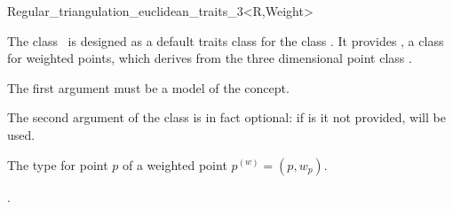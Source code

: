 

\begin{ccRefClass}{Regular_triangulation_euclidean_traits_3<R,Weight>}  %


\ccDefinition
  
The class \ccRefName\ is designed as a default traits class for the
class . 
It provides , a class for weighted points, which derives
from the three dimensional point class .

The first argument  must be a model of the  concept. 

The second argument  of the class
 is in fact
optional: if is it not provided,  will be used.


\ccIsModel
{}


\ccTypes
{}

{The type for point $p$ of a weighted point ${p}^{(w)}=(p,w_p)$.}
\ccGlue
{}



\ccSeeAlso

.

\end{ccRefClass}


